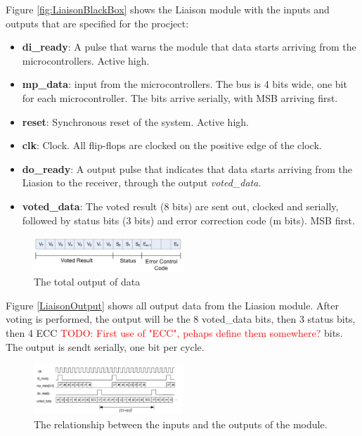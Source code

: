 \documentclass[a4paper]{IEEEtran}
\newcommand\TODO[1]{\textcolor{red}{TODO:#1}}
\newcommand\todo[1]{\TODO{#1}}
\begin{document}
Figure \ref{fig:LiaisonBlackBox} shows the Liaison module with the inputs and outputs that are specified for the procject:
\begin{itemize}
    \item \textbf{di\_ready}: A pulse that warns the module that data starts arriving from the microcontrollers. Active high.
    \item \textbf{mp\_data}: input from the microcontrollers. The bus is 4 bits wide, one bit for each microcontroller. The bits arrive serially, with MSB arriving first.
    \item \textbf{reset}: Synchronous reset of the system. Active high.
    \item \textbf{clk}: Clock. All flip-flops are clocked on the positive edge of the clock.
    \item \textbf{do\_ready}: A output pulse that indicates that data starts arriving from the Liasion to the receiver, through the output \textit{voted\_data}.
    \item  \textbf{voted\_data}: The voted result (8 bits) are sent out, clocked and serially, followed by status bits (3 bits) and error correction code (m bits). MSB first.
\end{itemize}

\begin{figure}[h!]
  \centering
      \includegraphics[width=0.5\textwidth]{Figures/ProjectDescription/LiaisonOutput}
  \caption{The total output of data}
  \label{fig:LiaisonOutput}
\end{figure}

Figure \ref{LiaisonOutput} shows all output data from the Liasion module. After voting is performed, the output will be the 8 voted\_data bits, then 3 status bits, then 4 ECC \todo{ First use of "ECC", pehaps define them somewhere?} bits. The output is sendt serially, one bit per cycle.

\begin{figure}[h!]
  \centering
      \includegraphics[width=0.5\textwidth]{Figures/ProjectDescription/LiaisonInputOutput}
  \caption{The relationship between the inputs and the outputs of the module.}
  \label{fig:LiaisonInputOutput}
\end{figure}
\end{document}
